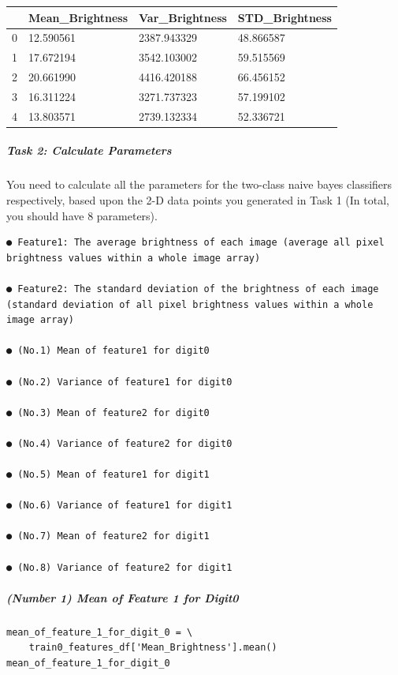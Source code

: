 \bigskip\noindent
\begin{tabular}{p{}p{}p{}p{}}
\toprule
 & Mean\_Brightness & Var\_Brightness & STD\_Brightness \\
\hline
0 & 12.590561 & 2387.943329 & 48.866587 \\
\hline
1 & 17.672194 & 3542.103002 & 59.515569 \\
\hline
2 & 20.661990 & 4416.420188 & 66.456152 \\
\hline
3 & 16.311224 & 3271.737323 & 57.199102 \\
\hline
4 & 13.803571 & 2739.132334 & 52.336721 \\
\hline
\bottomrule
\end{tabular}

\bigskip

\subparagraph{Task 2: Calculate Parameters}

You need to calculate all the parameters for the two-class naive bayes classifiers respectively, based upon the 2-D data points you generated in Task 1 (In total, you should have 8 parameters).

\begin{verbatim}
● Feature1: The average brightness of each image (average all pixel brightness values within a whole image array)
                                                  
● Feature2: The standard deviation of the brightness of each image (standard deviation of all pixel brightness values within a whole image array)

● (No.1) Mean of feature1 for digit0

● (No.2) Variance of feature1 for digit0

● (No.3) Mean of feature2 for digit0

● (No.4) Variance of feature2 for digit0

● (No.5) Mean of feature1 for digit1

● (No.6) Variance of feature1 for digit1

● (No.7) Mean of feature2 for digit1

● (No.8) Variance of feature2 for digit1
\end{verbatim}

\subparagraph{(Number 1) Mean of Feature 1 for Digit0}

\begin{verbatim}
mean_of_feature_1_for_digit_0 = \
    train0_features_df['Mean_Brightness'].mean()
mean_of_feature_1_for_digit_0
\end{verbatim}

